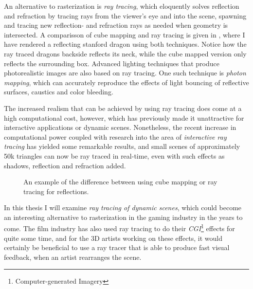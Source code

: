An alternative to rasterization is \textit{ray tracing}, which eloquently solves
reflection and refraction by tracing rays from the viewer's eye and into the
scene, spawning and tracing new reflection- and refraction rays as needed when
geometry is intersected. A comparisson of cube mapping and ray tracing is given
in , where I have rendered a reflecting stanford
dragon using both techniques. Notice how the ray traced dragons backside
reflects its neck, while the cube mapped version only reflects the surrounding
box. Advanced lighting techniques that produce photorealistic images are also
based on ray tracing. One such technique is \textit{photon mapping}, which can
accurately reproduce the effects of light bouncing of reflective surfaces,
caustics and color bleeding.




The increased realism that can be achieved by using ray tracing does come at a
high computational cost, however, which has previously made it unattractive for
interactive applications or dynamic scenes. Nonetheless, the recent increase in
computational power coupled with research into the area of \textit{interactive
  ray tracing} has yielded some remarkable results, and small scenes of
approximately 50k triangles can now be ray traced in real-time, even with such
effects as shadows, reflection and refraction added.

\begin{figure}
  \centering
  \hspace{10pt}
  \caption[Reflections created with cube mapping and ray tracing.]{An example of
    the difference between using cube mapping or ray tracing for
    reflections.}
  \label{fig:reflectingDragons}
\end{figure}



In this thesis I will examine \textit{ray tracing of dynamic scenes}, which
could become an interesting alternative to rasterization in the gaming industry
in the years to come. The film industry has also used ray tracing to do their
\textit{CGI}\footnote{Computer-generated Imagery} effects for quite some time,
and for the 3D artists working on these effects, it would certainly be
beneficial to use a ray tracer that is able to produce fast visual feedback,
when an artist rearranges the scene.


